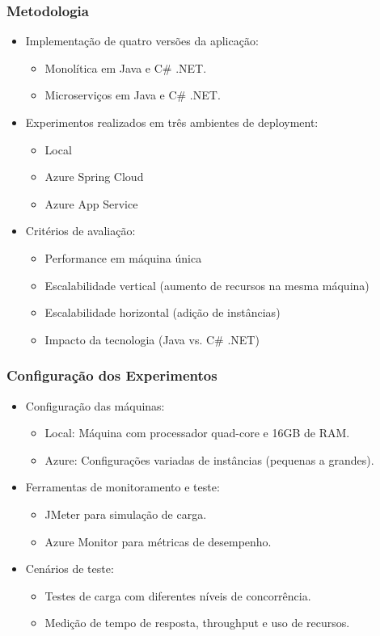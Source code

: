 \documentclass{beamer}
\begin{document}
\begin{frame}
\frametitle{Metodologia}
\begin{itemize}
    \item Implementação de quatro versões da aplicação:
    \begin{itemize}
        \item Monolítica em Java e C\# .NET.
        \item Microserviços em Java e C\# .NET.
    \end{itemize}
    \item Experimentos realizados em três ambientes de deployment:
    \begin{itemize}
        \item Local
        \item Azure Spring Cloud
        \item Azure App Service
    \end{itemize}
    \item Critérios de avaliação:
    \begin{itemize}
        \item Performance em máquina única
        \item Escalabilidade vertical (aumento de recursos na mesma máquina)
        \item Escalabilidade horizontal (adição de instâncias)
        \item Impacto da tecnologia (Java vs. C\# .NET)
    \end{itemize}
\end{itemize}
\end{frame}

\begin{frame}
\frametitle{Configuração dos Experimentos}
\begin{itemize}
    \item Configuração das máquinas:
    \begin{itemize}
        \item Local: Máquina com processador quad-core e 16GB de RAM.
        \item Azure: Configurações variadas de instâncias (pequenas a grandes).
    \end{itemize}
    \item Ferramentas de monitoramento e teste:
    \begin{itemize}
        \item JMeter para simulação de carga.
        \item Azure Monitor para métricas de desempenho.
    \end{itemize}
    \item Cenários de teste:
    \begin{itemize}
        \item Testes de carga com diferentes níveis de concorrência.
        \item Medição de tempo de resposta, throughput e uso de recursos.
    \end{itemize}
\end{itemize}
\end{frame}
\end{document}
